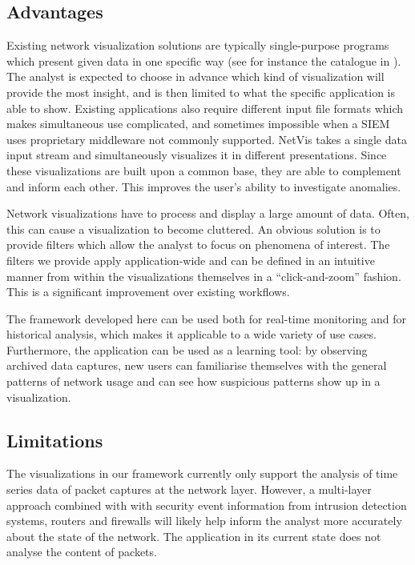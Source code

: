 \subsection{Advantages}
%
Existing network visualization solutions are typically single-purpose programs which present given
data in one specific way (see for instance the catalogue in \cite{marty2009applied}). The analyst is
expected to choose in advance which kind of visualization will provide the most insight, and is then
limited to what the specific application is able to show. Existing applications also require
different input file formats which makes simultaneous use complicated, and sometimes impossible when
a SIEM uses proprietary middleware not commonly supported. NetVis takes a single data input stream
and simultaneously visualizes it in different presentations. Since these visualizations are built
upon a common base, they are able to complement and inform each other. This improves the user's
ability to investigate anomalies.

Network visualizations have to process and display a large amount of data. Often, this can cause a
visualization to become cluttered. An obvious solution is to provide filters which allow the analyst
to focus on phenomena of interest. The filters we provide apply application-wide and can be defined
in an intuitive manner from within the visualizations themselves in a ``click-and-zoom'' fashion.
This is a significant improvement over existing workflows.

The framework developed here can be used both for real-time monitoring and for historical analysis,
which makes it applicable to a wide variety of use cases. Furthermore, the application can be used
as a learning tool: by observing archived data captures, new users can familiarise themselves with
the general patterns of network usage and can see how suspicious patterns show up in a
visualization.

\subsection{Limitations}
%
The visualizations in our framework currently only support the analysis of time series data of
packet captures at the network layer. However, a multi-layer approach combined with with security
event information from intrusion detection systems, routers and firewalls will likely help inform
the analyst more accurately about the state of the network. The application in its current state
does not analyse the content of packets.


